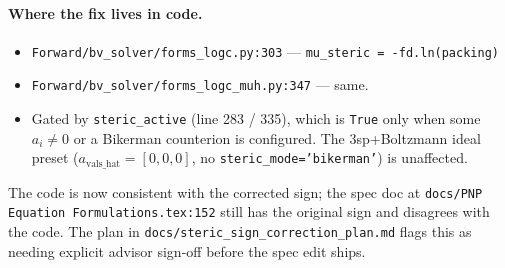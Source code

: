 \documentclass[11pt]{article}
\begin{document}
\paragraph{Where the fix lives in code.}
\begin{itemize}
  \item \texttt{Forward/bv\_solver/forms\_logc.py:303} ---
        \verb|mu_steric = -fd.ln(packing)|
  \item \texttt{Forward/bv\_solver/forms\_logc\_muh.py:347} --- same.
  \item Gated by \texttt{steric\_active} (line 283 / 335), which is
        \texttt{True} only when some $a_i \ne 0$ or a Bikerman
        counterion is configured. The 3sp+Boltzmann ideal preset
        ($a_{\mathrm{vals\_hat}} = [0,0,0]$, no
        \texttt{steric\_mode='bikerman'}) is unaffected.
\end{itemize}

The code is now consistent with the corrected sign; the spec doc at
\texttt{docs/PNP Equation Formulations.tex:152} still has the original
sign and disagrees with the code. The plan in
\texttt{docs/steric\_sign\_correction\_plan.md} flags this as needing
explicit advisor sign-off before the spec edit ships.
\end{document}
